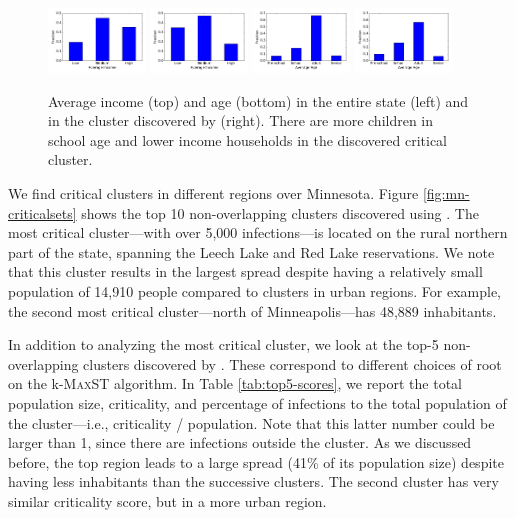 \begin{figure}
\centering
\includegraphics[width=0.23\textwidth]{img/mn-income.pdf}
\includegraphics[width=0.23\textwidth]{img/kmaxst-11-income.pdf}
\includegraphics[width=0.23\textwidth]{img/mn-age.pdf}
\includegraphics[width=0.23\textwidth]{img/kmaxst-11-age.pdf}
\caption{Average income (top) and age (bottom) in the entire state (left) and in the cluster discovered by \algomaxcrit{} (right). There are more children in school age and lower income households in the discovered critical cluster.}
\label{fig:cluster-demographics}
\end{figure}

We find critical clusters in different regions over Minnesota. Figure \ref{fig:mn-criticalsets} shows the top 10 non-overlapping clusters discovered using \algomaxcrit{}. The most critical cluster---with over 5,000 infections---is located on the rural northern part of the state, spanning the Leech Lake and Red Lake reservations. We note that this cluster results in the largest spread despite having a relatively small population of 14,910 people compared to clusters in urban regions. For example, the second most critical cluster---north of Minneapolis---has 48,889 inhabitants. %

In addition to analyzing the most critical cluster, we look at the top-5 non-overlapping clusters discovered by \algomaxcrit{}. These correspond to different choices of root on the k-\textsc{MaxST} algorithm. In Table \ref{tab:top5-scores}, we report the total population size, criticality, and percentage of infections to the total population of the cluster---i.e., criticality / population. Note that this latter number could be larger than 1, since there are infections outside the cluster. As we discussed before, the top region leads to a large spread (41\% of its population size) despite having less inhabitants than the successive clusters. The second cluster has very similar criticality score, but in a more urban region.

